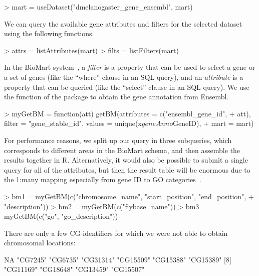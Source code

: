 %
\begin{Schunk}
\begin{Sinput}
> mart = useDataset("dmelanogaster_gene_ensembl", mart)
\end{Sinput}
\end{Schunk}
%
We can query the available gene attributes and filters for the
selected dataset using the following functions.
\begin{Schunk}
\begin{Sinput}
> attrs = listAttributes(mart)
> filts = listFilters(mart)
\end{Sinput}
\end{Schunk}
%
In the BioMart system~\cite{Kasprzyk2004}, a \emph{filter} is a
property that can be used to select a gene or a set of genes (like the
``where'' clause in an SQL query), and an \emph{attribute} is a
property that can be queried (like the ``select'' clause in an SQL
query). We use the  function of the package
 to obtain the gene annotation from Ensembl.
%
\begin{Schunk}
\begin{Sinput}
> myGetBM = function(att) getBM(attributes = c("ensembl_gene_id", 
+     att), filter = "gene_stable_id", values = unique(x$geneAnno$GeneID), 
+     mart = mart)
\end{Sinput}
\end{Schunk}
% 
For performance reasons, we split up our query in three subqueries,
which corresponds to different areas in the BioMart schema, and then
assemble the results together in R.  Alternatively, it would also be
possible to submit a single query for all of the attributes, but then
the result table will be enormous due to the 1:many mapping
especially from gene ID to GO categories~\cite{GO}.
%
\begin{Schunk}
\begin{Sinput}
> bm1 = myGetBM(c("chromosome_name", "start_position", "end_position", 
+     "description"))
> bm2 = myGetBM(c("flybase_name"))
> bm3 = myGetBM(c("go", "go_description"))
\end{Sinput}
\end{Schunk}
%
There are only a few CG-identifiers for which we were not able to
obtain chromosomal locations: 
%
\begin{Schunk}
\begin{Soutput}
 [1] NA        "CG7245"  "CG6735"  "CG31314" "CG15509" "CG15388" "CG15389"
 [8] "CG11169" "CG18648" "CG13459" "CG15507"
\end{Soutput}
\end{Schunk}
